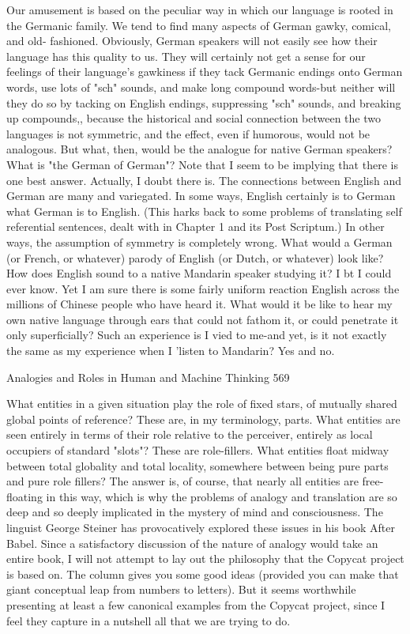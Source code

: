 Our amusement is based on the peculiar way in which our language is rooted in the
Germanic family. We tend to find many aspects of German gawky, comical, and old-
fashioned. Obviously, German speakers will not easily see how their language has this
quality to us. They will certainly not get a sense for our feelings of their language's
gawkiness if they tack Germanic endings onto German words, use lots of "sch"
sounds, and make long compound words-but neither will they do so by tacking on
English endings, suppressing "sch" sounds, and breaking up compounds,, because the
historical and social connection between the two languages is not symmetric, and the
effect, even if humorous, would not be analogous. But what, then, would be the
analogue for native German speakers? What is "the German of German"?
        Note that I seem to be implying that there is one best answer. Actually, I doubt
there is. The connections between English and German are many and variegated. In
some ways, English certainly is to German what German is to English. (This harks
back to some problems of translating self referential sentences, dealt with in Chapter 1
and its Post Scriptum.) In other ways, the assumption of symmetry is completely
wrong. What would a German (or French, or whatever) parody of English (or Dutch,
or whatever) look like?
        How does English sound to a native Mandarin speaker studying it? I bt I could
ever know. Yet I am sure there is some fairly uniform reaction English across the
millions of Chinese people who have heard it. What would it be like to hear my own
native language through ears that could not fathom it, or could penetrate it only
superficially? Such an experience is I vied to me-and yet, is it not exactly the same as
my experience when I 'listen to Mandarin? Yes and no.




Analogies and Roles in Human and Machine Thinking                                   569

What entities in a given situation play the role of fixed stars, of mutually shared
global points of reference? These are, in my terminology, parts. What entities are seen
entirely in terms of their role relative to the perceiver, entirely as local occupiers of
standard "slots"? These are role-fillers. What entities float midway between total
globality and total locality, somewhere between being pure parts and pure role fillers?
The answer is, of course, that nearly all entities are free-floating in this way, which is
why the problems of analogy and translation are so deep and so deeply implicated in
the mystery of mind and consciousness. The linguist George Steiner has provocatively
explored these issues in his book After Babel.
        Since a satisfactory discussion of the nature of analogy would take an entire
book, I will not attempt to lay out the philosophy that the Copycat project is based on.
The column gives you some good ideas (provided you can make that giant conceptual
leap from numbers to letters). But it seems worthwhile presenting at least a few
canonical examples from the Copycat project, since I feel they capture in a nutshell all
that we are trying to do.


